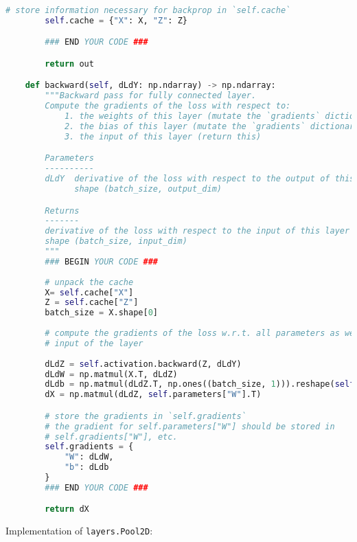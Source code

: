 \begin{lstlisting}[language=Python]
        # store information necessary for backprop in `self.cache`
        self.cache = {"X": X, "Z": Z}

        ### END YOUR CODE ###

        return out

    def backward(self, dLdY: np.ndarray) -> np.ndarray:
        """Backward pass for fully connected layer.
        Compute the gradients of the loss with respect to:
            1. the weights of this layer (mutate the `gradients` dictionary)
            2. the bias of this layer (mutate the `gradients` dictionary)
            3. the input of this layer (return this)

        Parameters
        ----------
        dLdY  derivative of the loss with respect to the output of this layer
              shape (batch_size, output_dim)

        Returns
        -------
        derivative of the loss with respect to the input of this layer
        shape (batch_size, input_dim)
        """
        ### BEGIN YOUR CODE ###
       
        # unpack the cache
        X= self.cache["X"]
        Z = self.cache["Z"]
        batch_size = X.shape[0]
        
        # compute the gradients of the loss w.r.t. all parameters as well as the
        # input of the layer
        
        dLdZ = self.activation.backward(Z, dLdY)
        dLdW = np.matmul(X.T, dLdZ)
        dLdb = np.matmul(dLdZ.T, np.ones((batch_size, 1))).reshape(self.n_out,)
        dX = np.matmul(dLdZ, self.parameters["W"].T)

        # store the gradients in `self.gradients`
        # the gradient for self.parameters["W"] should be stored in
        # self.gradients["W"], etc.
        self.gradients = {
            "W": dLdW,
            "b": dLdb
        }
        ### END YOUR CODE ###

        return dX

\end{lstlisting}

Implementation of \texttt{layers.Pool2D}:

